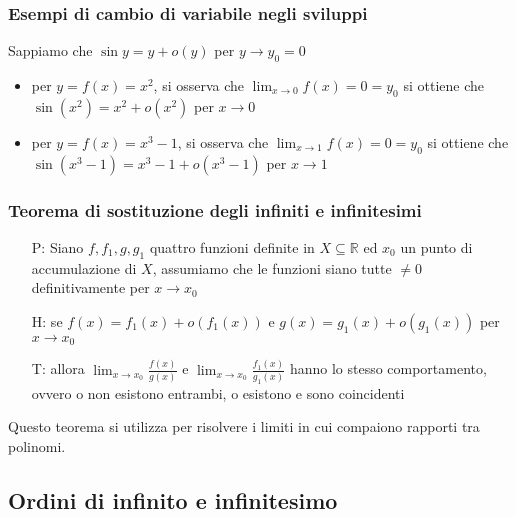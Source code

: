 \documentclass[a4paper]{article}
\begin{document}
\subsubsection*{Esempi di cambio di variabile negli sviluppi}
Sappiamo che \(\sin y = y + o(y)\) per \(y \to y_0 = 0\)
\begin{itemize}
	\item per \(y = f(x) = x^2\), si osserva che \(\displaystyle \lim_{x \to 0} f(x) = 0 = y_0\) si ottiene che \\ \(\sin(x^2) = x^2 + o(x^2)\) per \(x \to 0\)
	\item per \(y = f(x) = x^3 - 1\), si osserva che \(\displaystyle \lim_{x \to 1} f(x) = 0 = y_0\) si ottiene che \\ \(\sin(x^3 - 1) = x^3 - 1 + o(x^3 - 1)\) per \(x \to 1\)
\end{itemize}

\subsubsection*{Teorema di sostituzione degli infiniti e infinitesimi}
\begin{itemize}
	\item[P:] Siano \(f, f_1, g, g_1\) quattro funzioni definite in \(X \subseteq \mathbb{R}\) ed \(x_0\) un punto di accumulazione di \(X\),
	assumiamo che le funzioni siano tutte \(\neq 0\) definitivamente per \(x \to x_0\)
	\item[H:] se \(f(x) = f_1(x) + o(f_1(x))\) e \(g(x) = g_1(x) + o(g_1(x))\) per \(x \to x_0\)
	\item[T:] allora \(\displaystyle \lim_{x \to x_0} \frac{f(x)}{g(x)}\) e \(\displaystyle \lim_{x \to x_0} \frac{f_1(x)}{g_1(x)}\) hanno lo stesso comportamento,
	ovvero o non esistono entrambi, o esistono e sono coincidenti
\end{itemize}
Questo teorema si utilizza per risolvere i limiti in cui compaiono rapporti tra polinomi.

\subsection{Ordini di infinito e infinitesimo}
\end{document}
